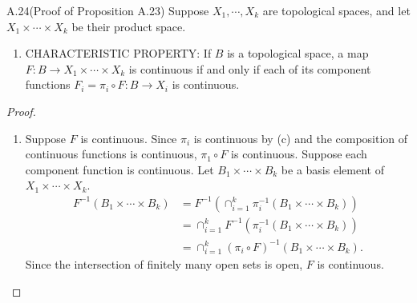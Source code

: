 \begin{customexer}{A.24(Proof of Proposition A.23)}\label{exercise_a_24}
  Suppose $X_1, \cdots, X_k$ are topological spaces, and let $X_1 \times \cdots \times X_k$ be their product space.
  \begin{enumerate}[label=(\alph*)]
    \item
      CHARACTERISTIC PROPERTY: If $B$ is a topological space, a map $F: B \rightarrow X_1 \times \cdots \times X_k$ is continuous if and only if each of its component functions $F_i = \pi_i \circ F: B \rightarrow X_i$ is continuous.
  \end{enumerate}
\end{customexer}

\begin{proof}
  $ $
  \begin{enumerate}[label=(\alph*)]
    \item
      Suppose $F$ is continuous.
      Since $\pi_i$ is continuous by (c) and the composition of continuous functions is continuous, $\pi_1 \circ F$ is continuous.
      Suppose each component function is continuous.
      Let $B_1 \times \cdots \times B_k$ be a basis element of $X_1 \times \cdots \times X_k$.
      \begin{align*}
        F^{-1}(B_1 \times \cdots \times B_k)
          &= F^{-1}(\cap_{i=1}^{k} \pi_i^{-1}(B_1 \times \cdots \times B_k)) \\
          &= \cap_{i=1}^{k} F^{-1}(\pi_i^{-1}(B_1 \times \cdots \times B_k)) \\
          &= \cap_{i=1}^{k} (\pi_i \circ F)^{-1}(B_1 \times \cdots \times B_k).
      \end{align*}
      Since the intersection of finitely many open sets is open, $F$ is continuous.
  \end{enumerate}
\end{proof}
